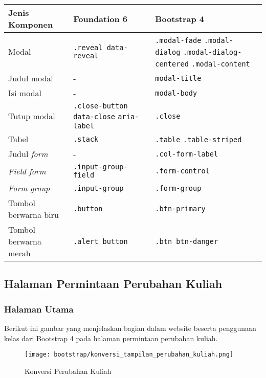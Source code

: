 \begin{tabular}{| p{} | p{} | p{} |} 
	\hline
	\textbf{Jenis Komponen} & \textbf{Foundation 6} & \textbf{Bootstrap 4}  \\ [0.5ex] 
	\hline	
	Modal & \texttt{.reveal data-reveal} & \texttt{.modal-fade} \newline \texttt{.modal-dialog} \newline \texttt{.modal-dialog-centered} \newline \texttt{.modal-content} \\
	\hline
	Judul modal & - & \texttt{modal-title}\\
	\hline
	Isi modal & - & \texttt{modal-body}\\
	\hline
	Tutup modal & \texttt{.close-button} \newline \texttt{data-close} \newline \texttt{aria-label} & \texttt{.close}\\
	\hline	
	Tabel & \texttt{.stack} & \texttt{.table} \newline \texttt{.table-striped} \\	
	\hline 
	Judul \textit{form} & - & \texttt{.col-form-label}\\
	\hline
	\textit{Field form} & \texttt{.input-group-field} & \texttt{.form-control}\\
	\hline
	\textit{Form group} & \texttt{.input-group} & \texttt{.form-group}\\
	\hline
	Tombol berwarna biru & \texttt{.button} & \texttt{.btn-primary}  \\
	\hline
	Tombol berwarna merah & \texttt{.alert button} & \texttt{.btn btn-danger} \\[1ex]
	\hline
\end{tabular}

\subsection{Halaman Permintaan Perubahan Kuliah}
\subsubsection{Halaman Utama}
\noindent Berikut ini gambar yang menjelaskan bagian dalam website beserta penggunaan kelas dari Bootstrap 4 pada halaman permintaan perubahan kuliah.\\
\begin{figure} [H]
	\centering  
	\texttt{[image: bootstrap/konversi\_tampilan\_perubahan\_kuliah.png]}
	\caption{Konversi Perubahan Kuliah}
\end{figure}

